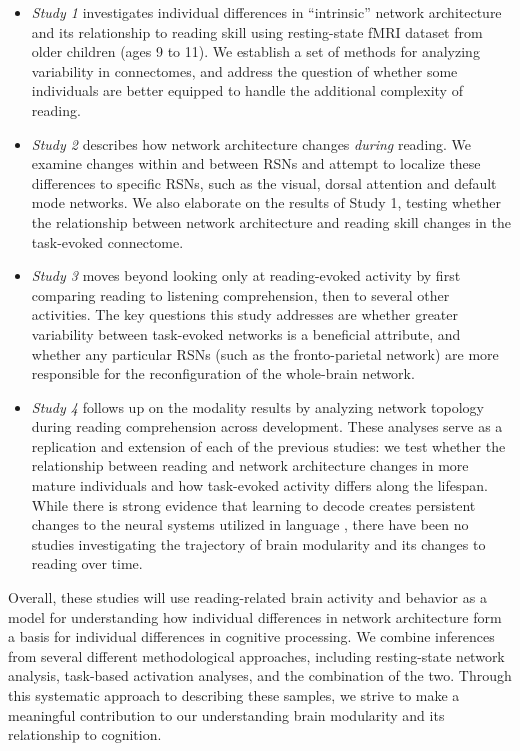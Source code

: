 \begin{itemize}

    \item \textit{Study 1} investigates individual differences in ``intrinsic'' network architecture and its relationship to reading skill using resting-state fMRI dataset from older children (ages 9 to 11). We establish a set of methods for analyzing variability in connectomes, and address the question of whether some individuals are better equipped to handle the additional complexity of reading. 

    \item \textit{Study 2} describes how network architecture changes \textit{during} reading. We examine changes within and between RSNs and attempt to localize these differences to specific RSNs, such as the visual, dorsal attention and default mode networks. We also elaborate on the results of Study 1, testing whether the relationship between network architecture and reading skill changes in the task-evoked connectome. 

    \item \textit{Study 3} moves beyond looking only at reading-evoked activity by first comparing reading to listening comprehension, then to several other activities. The key questions this study addresses are whether greater variability between task-evoked networks is a beneficial attribute, and whether any particular RSNs (such as the fronto-parietal network) are more responsible for the reconfiguration of the whole-brain network.

    \item \textit{Study 4} follows up on the modality results by analyzing network topology during reading comprehension across development. These analyses serve as a replication and extension of each of the previous studies: we test whether the relationship between reading and network architecture changes in more mature individuals and how task-evoked activity differs along the lifespan. While there is strong evidence that learning to decode creates persistent changes to the neural systems utilized in language \citep{Schlaggar2007}, there have been no studies investigating the trajectory of brain modularity and its changes to reading over time.

\end{itemize}

Overall, these studies will use reading-related brain activity and behavior as a model for understanding how individual differences in network architecture form a basis for individual differences in cognitive processing. We combine inferences from several different methodological approaches, including resting-state network analysis, task-based activation analyses, and the combination of the two. Through this systematic approach to describing these samples, we strive to make a meaningful contribution to our understanding brain modularity and its relationship to cognition.